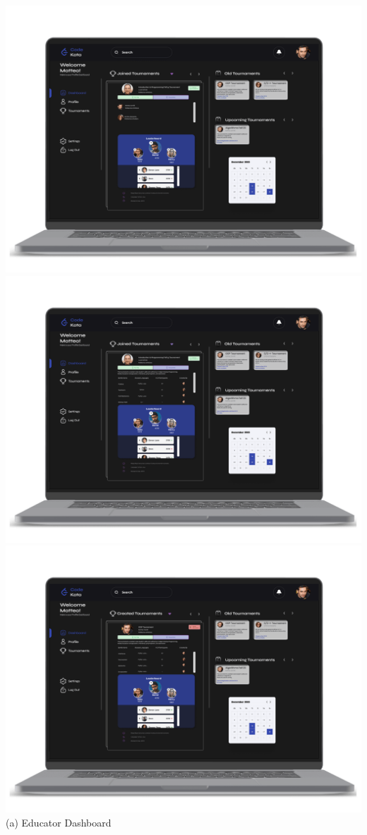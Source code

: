 \begin{center}
\includegraphics[scale=0.13]{Images/ui-ux/educator_dashboard/educator_dashboard_1.png}
\includegraphics[scale=0.13]{Images/ui-ux/educator_dashboard/educator_dashboard_2.png}
\includegraphics[scale=0.13]{Images/ui-ux/educator_dashboard/educator_dashboard_3.png}
\\ (a) Educator Dashboard
\end{center}
